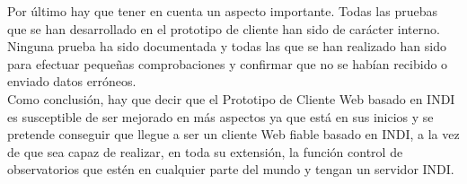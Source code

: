 Por último hay que tener en cuenta un aspecto importante. Todas las pruebas que se han desarrollado en el prototipo de cliente han sido de carácter interno. Ninguna prueba ha sido documentada y todas las que se han realizado han sido para efectuar pequeñas comprobaciones y confirmar que no se habían recibido o enviado datos erróneos.\\

Como conclusión, hay que decir que el Prototipo de Cliente Web basado en INDI es susceptible de ser mejorado en más aspectos ya que está en sus inicios y se pretende conseguir que llegue a ser un cliente Web fiable basado en INDI, a la vez de que sea capaz de realizar, en toda su extensión, la función control de observatorios que estén en cualquier parte del mundo y tengan un servidor INDI.\\
